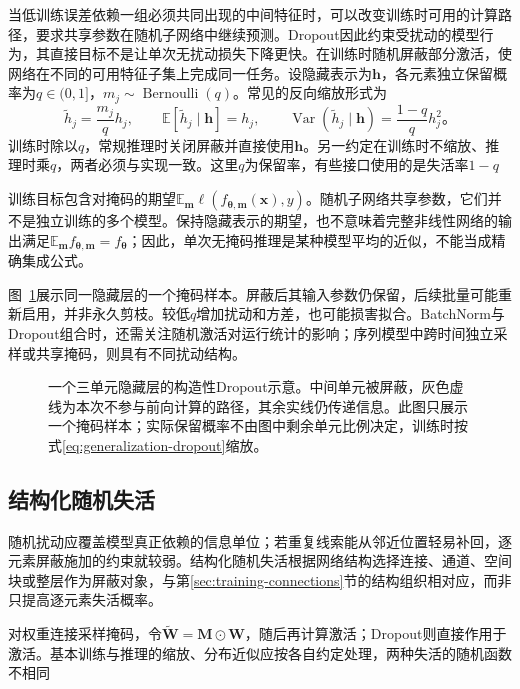当低训练误差依赖一组必须共同出现的中间特征时，可以改变训练时可用的计算路径，要求共享参数在随机子网络中继续预测。Dropout因此约束受扰动的模型行为，其直接目标不是让单次无扰动损失下降更快。在训练时随机屏蔽部分激活，使网络在不同的可用特征子集上完成同一任务。设隐藏表示为$\bm h$，各元素独立保留概率为$q\in(0,1]$，$m_j\sim\operatorname{Bernoulli}(q)$。常见的反向缩放形式为
\begin{equation}
  \tilde h_j=\frac{m_j}{q}h_j,\qquad
  \mathbb E[\tilde h_j\mid\bm h]=h_j,\qquad
  \operatorname{Var}(\tilde h_j\mid\bm h)=\frac{1-q}{q}h_j^2\text{。}
  \label{eq:generalization-dropout}
\end{equation}
训练时除以$q$，常规推理时关闭屏蔽并直接使用$\bm h$。另一约定在训练时不缩放、推理时乘$q$，两者必须与实现一致。这里$q$为保留率，有些接口使用的是失活率$1-q$

训练目标包含对掩码的期望$\mathbb E_{\bm m}\ell(f_{\bm\theta,\bm m}(\bm x),y)$。随机子网络共享参数，它们并不是独立训练的多个模型。保持隐藏表示的期望，也不意味着完整非线性网络的输出满足$\mathbb E_{\bm m}f_{\bm\theta,\bm m}=f_{\bm\theta}$；因此，单次无掩码推理是某种模型平均的近似，不能当成精确集成公式。

图~\ref{fig:generalization-dropout}展示同一隐藏层的一个掩码样本。屏蔽后其输入参数仍保留，后续批量可能重新启用，并非永久剪枝。较低$q$增加扰动和方差，也可能损害拟合。BatchNorm与Dropout组合时，还需关注随机激活对运行统计的影响；序列模型中跨时间独立采样或共享掩码，则具有不同扰动结构。
\begin{figure}[htbp]
  \centering
  
  \caption{一个三单元隐藏层的构造性Dropout示意。中间单元被屏蔽，灰色虚线为本次不参与前向计算的路径，其余实线仍传递信息。此图只展示一个掩码样本；实际保留概率不由图中剩余单元比例决定，训练时按式\eqref{eq:generalization-dropout}缩放。}
  \label{fig:generalization-dropout}
\end{figure}

\subsection{结构化随机失活}
\label{sec:generalization-structured-dropout}

随机扰动应覆盖模型真正依赖的信息单位；若重复线索能从邻近位置轻易补回，逐元素屏蔽施加的约束就较弱。结构化随机失活根据网络结构选择连接、通道、空间块或整层作为屏蔽对象，与第\ref{sec:training-connections}节的结构组织相对应，而非只提高逐元素失活概率。

对权重连接采样掩码，令$\tilde{\bm W}=\bm M\odot\bm W$，随后再计算激活；Dropout则直接作用于激活。基本训练与推理的缩放、分布近似应按各自约定处理，两种失活的随机函数不相同

